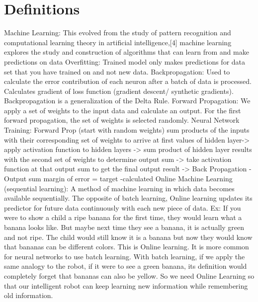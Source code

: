 \documentclass[draftclsnofoot, onecolumn, 10pt, compsoc]{IEEEtran}
\begin{document}
\section{Definitions}
Machine Learning: This evolved from the study of pattern recognition and computational learning theory in artificial intelligence,[4] machine learning explores the study and construction of algorithms that can learn from and make predictions on data
\newline \newline
Overfitting: Trained model only makes predictions for data set that you have trained on and not new data.
\newline \newline
Backpropagation: Used to calculate the error contribution of each neuron after a batch of data is processed. Calculates gradient of loss function (gradient descent/ synthetic gradients). Backpropagation is a generalization of the Delta Rule.
\newline \newline
Forward Propagation: We apply a set of weights to the input data and calculate an output. For the first forward propagation, the set of weights is selected randomly.
\newline \newline
Neural Network Training: Forward Prop (start with random weights) sum products of the inputs with their corresponding set of weights to arrive at first values of hidden layer-> apply activation function to hidden layers -> sum product of hidden layer results with the second set of weights to determine output sum -> take activation function at that output sum to get the final output result -> Back Propagation \cite{neuralnets} \newline
		-Output sum margin of error = target -calculated
\newline \newline
Online Machine Learning (sequential learning): A method of machine learning in which data becomes available sequentially. The opposite of batch learning, Online learning updates its predictor for future data continuously with each new piece of data. Ex: If you were to show a child a ripe banana for the first time, they would learn what a banana looks like. But maybe next time they see a banana, it is actually green and not ripe. The child would still know it is a banana but now they would know that bananas can be different colors. This is Online learning. It is more common for neural networks to use batch learning. With batch learning, if we apply the same analogy to the robot, if it were to see a green banana, its definition would completely forget that bananas can also be yellow. So we need Online Learning so that our intelligent robot can keep learning new information while remembering old information.
\end{document}
